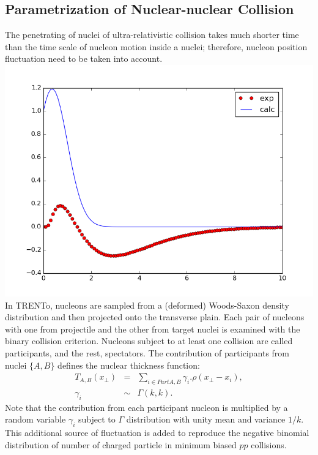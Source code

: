 \documentclass[10pt,a4paper, twocolumn]{article}
\begin{document}
	\subsection{Parametrization of Nuclear-nuclear Collision}
	The penetrating of nuclei of ultra-relativistic collision takes much shorter time than the time scale of nucleon motion inside a nuclei; therefore, nucleon position fluctuation need to be taken into account. 
	\includegraphics[width=\columnwidth]{pics/place_holder.png}
	In TRENTo, nucleons are sampled from a (deformed) Woods-Saxon density distribution and then projected onto the transverse plain. 
	Each pair of nucleons with one from projectile and the other from target nuclei is examined with the binary collision criterion. 
	Nucleons subject to at least one collision are called participants, and the rest, spectators.
	The contribution of participants from nuclei $\{A,B\}$ defines the nuclear thickness function:
	\begin{eqnarray}
		T_{A,B}(x_\perp) &=& \sum_{i \in Part A,B} \gamma_i. \rho(x_\perp- x_i), \\
		\gamma_i &\sim& \Gamma(k, k).
	\end{eqnarray}
	Note that the contribution from each participant nucleon is multiplied by a random variable $\gamma_i$ subject to $\Gamma$ distribution with unity mean and variance $1/k$. 
	This additional source of fluctuation is added to reproduce the negative binomial distribution of number of charged particle in minimum biased $pp$ collisions.
\end{document}
